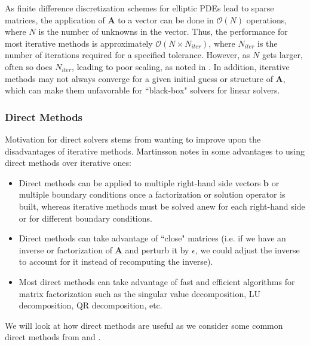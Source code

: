 As finite difference discretization schemes for elliptic PDEs lead to sparse matrices, the application of $\textbf{A}$ to a vector can be done in $\mathcal{O}(N)$ operations, where $N$ is the number of unknowns in the vector. Thus, the performance for most iterative methods is approximately $\mathcal{O}(N \times N_{iter})$, where $N_{iter}$ is the number of iterations required for a specified tolerance. However, as $N$ gets larger, often so does $N_{iter}$, leading to poor scaling, as noted in \citep{martinsson2019fast}. In addition, iterative methods may not always converge for a given initial guess or structure of $\textbf{A}$, which can make them unfavorable for ``black-box" solvers for linear solvers.

\subsubsection{Direct Methods}
\label{sub:direct-methods}

Motivation for direct solvers stems from wanting to improve upon the disadvantages of iterative methods. Martinsson notes in \citep{martinsson2004fast} some advantages to using direct methods over iterative ones:
\begin{itemize}
    \item Direct methods can be applied to multiple right-hand side vectors $\textbf{b}$ or multiple boundary conditions once a factorization or solution operator is built, whereas iterative methods must be solved anew for each right-hand side or for different boundary conditions.

    \item Direct methods can take advantage of ``close" matrices (i.e. if we have an inverse or factorization of $\textbf{A}$ and perturb it by $\epsilon$, we could adjust the inverse to account for it instead of recomputing the inverse).

    \item Most direct methods can take advantage of fast and efficient algorithms for matrix factorization such as the singular value decomposition, LU decomposition, QR decomposition, etc.
\end{itemize}
We will look at how direct methods are useful as we consider some common direct methods from \citep{leveque2007finite} and \citep{trefethen1997numerical}.

